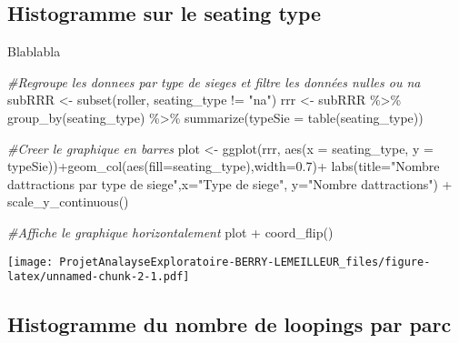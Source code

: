 \documentclass[
]{article}
\newenvironment{Shaded}{\begin{snugshade}}{\end{snugshade}}
\newcommand{\AttributeTok}[1]{\textcolor[rgb]{0.77,0.63,0.00}{#1}}
\newcommand{\CommentTok}[1]{\textcolor[rgb]{0.56,0.35,0.01}{\textit{#1}}}
\newcommand{\FloatTok}[1]{\textcolor[rgb]{0.00,0.00,0.81}{#1}}
\newcommand{\FunctionTok}[1]{\textcolor[rgb]{0.00,0.00,0.00}{#1}}
\newcommand{\NormalTok}[1]{#1}
\newcommand{\OtherTok}[1]{\textcolor[rgb]{0.56,0.35,0.01}{#1}}
\newcommand{\SpecialCharTok}[1]{\textcolor[rgb]{0.00,0.00,0.00}{#1}}
\newcommand{\StringTok}[1]{\textcolor[rgb]{0.31,0.60,0.02}{#1}}
\begin{document}
\hypertarget{histogramme-sur-le-seating-type}{%
\subsection{Histogramme sur le seating
type}\label{histogramme-sur-le-seating-type}}

Blablabla

\begin{Shaded}
\begin{Highlighting}[]
\CommentTok{\#Regroupe les donnees par type de sieges et filtre les données nulles ou na}
\NormalTok{subRRR }\OtherTok{\textless{}{-}} \FunctionTok{subset}\NormalTok{(roller, seating\_type }\SpecialCharTok{!=} \StringTok{"na"}\NormalTok{)}
\NormalTok{rrr }\OtherTok{\textless{}{-}}\NormalTok{ subRRR }\SpecialCharTok{\%\textgreater{}\%} \FunctionTok{group\_by}\NormalTok{(seating\_type) }\SpecialCharTok{\%\textgreater{}\%}
  \FunctionTok{summarize}\NormalTok{(}\AttributeTok{typeSie =} \FunctionTok{table}\NormalTok{(seating\_type))}

\CommentTok{\#Creer le graphique en barres}
\NormalTok{plot }\OtherTok{\textless{}{-}} \FunctionTok{ggplot}\NormalTok{(rrr, }\FunctionTok{aes}\NormalTok{(}\AttributeTok{x =}\NormalTok{ seating\_type, }\AttributeTok{y =}\NormalTok{ typeSie))}\SpecialCharTok{+}\FunctionTok{geom\_col}\NormalTok{(}\FunctionTok{aes}\NormalTok{(}\AttributeTok{fill=}\NormalTok{seating\_type),}\AttributeTok{width=}\FloatTok{0.7}\NormalTok{)}\SpecialCharTok{+} \FunctionTok{labs}\NormalTok{(}\AttributeTok{title=}\StringTok{"Nombre dattractions par type de siege"}\NormalTok{,}\AttributeTok{x=}\StringTok{"Type de siege"}\NormalTok{, }\AttributeTok{y=}\StringTok{"Nombre dattractions"}\NormalTok{) }\SpecialCharTok{+} \FunctionTok{scale\_y\_continuous}\NormalTok{()}

\CommentTok{\#Affiche le graphique horizontalement}
\NormalTok{plot }\SpecialCharTok{+} \FunctionTok{coord\_flip}\NormalTok{()}
\end{Highlighting}
\end{Shaded}

\texttt{[image: ProjetAnalayseExploratoire-BERRY-LEMEILLEUR\_files/figure-latex/unnamed-chunk-2-1.pdf]}

\hypertarget{histogramme-du-nombre-de-loopings-par-parc}{%
\subsection{Histogramme du nombre de loopings par
parc}\label{histogramme-du-nombre-de-loopings-par-parc}}
\end{document}
